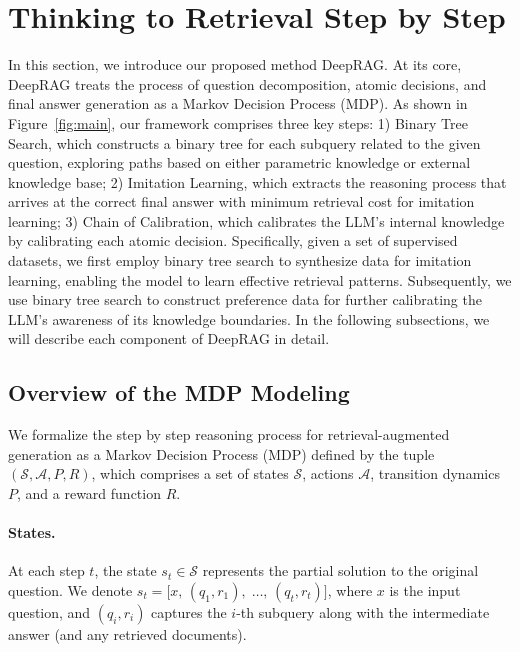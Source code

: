 \section{Thinking to Retrieval Step by Step}

In this section, we introduce our proposed method DeepRAG.
At its core, DeepRAG treats the process of question decomposition, atomic decisions, and final answer generation as a Markov Decision Process (MDP).
% 
As shown in Figure~\ref{fig:main}, our framework comprises three key steps: 
1) Binary Tree Search, which constructs a binary tree for each subquery related to the given question, exploring paths based on either parametric knowledge or external knowledge base; 
2) Imitation Learning, which extracts the reasoning process that arrives at the correct final answer with minimum retrieval cost for imitation learning; 
3) Chain of Calibration, which calibrates the LLM's internal knowledge by calibrating each atomic decision. 
% 
Specifically, given a set of supervised datasets, we first employ binary tree search to synthesize data for imitation learning, enabling the model to learn effective retrieval patterns. 
Subsequently, we use binary tree search to construct preference data for further calibrating the LLM's awareness of its knowledge boundaries. 
% 
In the following subsections, we will describe each component of DeepRAG in detail.


\subsection{Overview of the MDP Modeling}
\label{overview}
We formalize the step by step reasoning process for retrieval-augmented generation as a Markov Decision Process (MDP) defined by the tuple \((\mathcal{S}, \mathcal{A}, P, R)\), which comprises a set of states \(\mathcal{S}\), actions \(\mathcal{A}\), transition dynamics \(P\), and a reward function \(R\).


\paragraph{States.}
At each step \(t\), the state \(s_t \in \mathcal{S}\) represents the partial solution to the original question. We denote
$s_t = \bigl[x,\,(q_1, r_1),\;\dots,\,(q_{t}, r_{t})\bigr]$,
where \(x\) is the input question, and \((q_i, r_i)\) captures the \(i\)-th subquery along with the intermediate answer (and any retrieved documents). 


